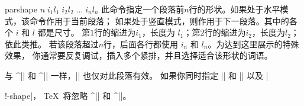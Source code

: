 
%
\begindesc
\cts parshape {$n\; i_1 l_1\; i_2 l_2\; \ldots \;i_n l_n$}
\explain
此命令指定一个段落前$n$行的形状。如果处于水平模式，该命令作用于当前段落；
如果处于竖直模式，则作用于下一段落。其中的各个 $i$ 和 $l$ 都是尺寸。
第$1$行的缩进为$i_1$，长度为 $l_1$；第$2$行的缩进为$i_2$，长度为$l_2$；依此类推。
若该段落超过$n$行，后面各行都使用 $i_n$ 和 $l_n$。为达到这里展示的特殊效果，
你通常要反复调试，插入多个紧排，并且选择适合该形状的词语。

与 ^|\hangafter| 和 ^|\hangindent| 一样，|\parshape| 也仅对此段落有效。
如果你同时指定 |\hangafter| 和 |\hangindent| 以及 |\par!-shape|，
\TeX\ 将忽略 ^|\hangafter| 和 ^|\hangindent|。
\ifodd\pageno\vfill\eject\fi %

